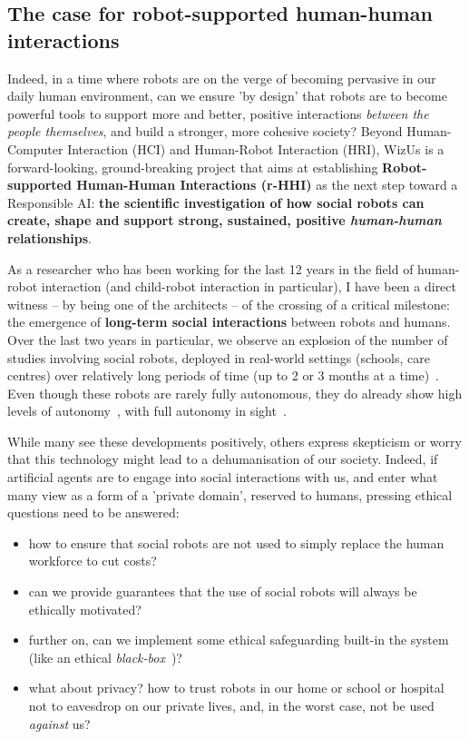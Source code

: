 \documentclass[11pt,a4paper]{report}
\newcommand{\project}{WizUs\xspace}
\begin{document}
\subsection{The case for robot-supported human-human interactions}

Indeed, in a time where robots are on the verge of becoming pervasive in our
daily human environment, can we ensure 'by design' that robots are to become
powerful tools to support more and better, positive interactions \emph{between
the people themselves}, and build a stronger, more cohesive society? Beyond
Human-Computer Interaction (HCI) and Human-Robot Interaction (HRI), \project is
a forward-looking, ground-breaking project that aims at establishing
\textbf{Robot-supported Human-Human Interactions (r-HHI)} as the next step
toward a Responsible AI: \textbf{the scientific investigation of how social
robots can create, shape and support strong, sustained, positive
\emph{human-human} relationships}.

As a researcher who has been working for the last 12 years in the field of
human-robot interaction (and child-robot interaction in particular), I have been
a direct witness -- by being one of the architects -- of the crossing of a
critical milestone: the emergence of \textbf{long-term social interactions}
between robots and humans. Over the last two years in particular, we observe an
explosion of the number of studies involving social robots, deployed in
real-world settings (schools, care centres) over relatively long periods of time
(up to 2 or 3 months at a time)~\cite{kunze2018artificial,leite2013social}. Even
though these robots are rarely fully autonomous, they do already show high
levels of autonomy~\cite{senft2019teaching}, with full autonomy in
sight~\cite{hawes2017strands}.

While many see these developments positively,
others express skepticism or worry that this technology might lead to a
dehumanisation of our society. Indeed, if artificial agents are to engage into
social interactions with us, and enter what many view as a form of a 'private
domain', reserved to humans, pressing ethical questions need to be answered:

\begin{itemize}
    \item how to ensure that social robots are not used to simply replace the human
        workforce to cut costs?
    \item can we provide guarantees that the use of social robots will always be
        ethically motivated?
    \item further on, can we implement some ethical safeguarding built-in
        the system (like an ethical \emph{black-box}~\cite{winfield2017case})?
    \item what about privacy? how to trust robots in our home or school or
        hospital not to eavesdrop on our private lives, and, in the worst
        case, not be used \emph{against} us?
\end{itemize}
\end{document}
